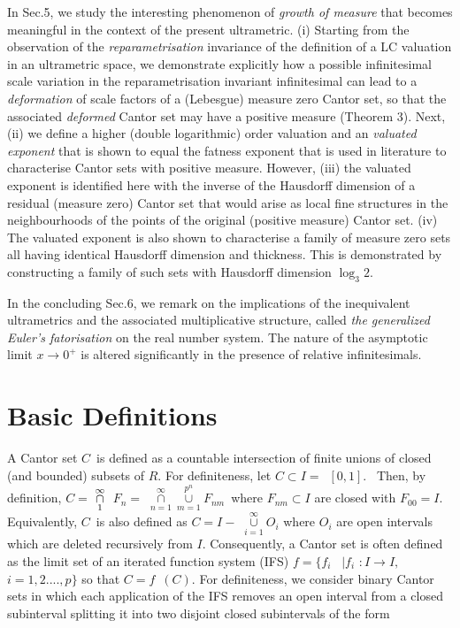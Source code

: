 \documentclass[12pt]{article}
\begin{document}
\vspace{.25cm}

In Sec.5, we study the interesting phenomenon of {\em growth of measure} that becomes meaningful in the context of the present ultrametric. (i) Starting from the observation of the {\em reparametrisation} invariance of the definition of a LC valuation in an ultrametric space, we demonstrate explicitly how a possible infinitesimal scale variation  in the reparametrisation invariant infinitesimal can lead to a {\em deformation} of scale factors of a (Lebesgue) measure zero Cantor set, so that the associated {\em deformed} Cantor set may have a positive measure (Theorem 3).  Next, (ii) we define a higher (double logarithmic) order valuation and an {\em valuated exponent} that is shown to equal the fatness exponent that is used in literature \cite{far1, far2} to characterise Cantor sets with positive measure. However, (iii) the valuated exponent is identified here with the inverse of the Hausdorff dimension of a residual  (measure zero) Cantor set that would arise as local fine structures in the neighbourhoods of the points of the original (positive measure) Cantor set. (iv) The valuated exponent is also shown to characterise a family of measure zero sets all having identical Hausdorff dimension and thickness. This is demonstrated by constructing a family of such sets with Hausdorff dimension $\log_3 2$.

\vspace{.25cm}

In the  concluding Sec.6, we remark on the implications of the inequivalent ultrametrics and the associated multiplicative structure, called {\em the generalized Euler's fatorisation} on the real number system. The nature of the asymptotic limit $x\rightarrow 0^+$ is altered significantly in the presence of relative infinitesimals.
  
\section{Basic Definitions}

A Cantor set $C$\ is  defined as a countable intersection of
finite unions of closed (and bounded) subsets of $R$. For definiteness, let $%
C\subset I=$\ $[0,1]$. \ Then, by definition, $C=$ $\overset{\infty }{%
\underset{1}{\cap }}$ $\ F_{n}=$ $\underset{n=1}{\overset{\infty }{\cap }}%
\underset{m=1}{\overset{p ^{n}}{\cup }}F_{nm}$\ where $F_{nm}\subset I$ are
closed with $F_{00}=I.$ Equivalently, $C$\ is also defined as $C=I-$ $%
\underset{i=1}{\overset{\infty }{\cup }}O_{i}$ where $O_{i}$ are open
intervals which are deleted recursively from $I$. Consequently, a Cantor set
is often defined as the limit set of an iterated function system (IFS) $f=\{f_{i}$%
\ $\mid f_i$ $:I\rightarrow I,$ $i=1,2....,p \}$ so that $C=f$\ $(C)$. For
definiteness, we consider binary Cantor sets in which each application of the
IFS removes an open interval from a closed subinterval
splitting it into two disjoint closed subintervals of the form
\end{document}

